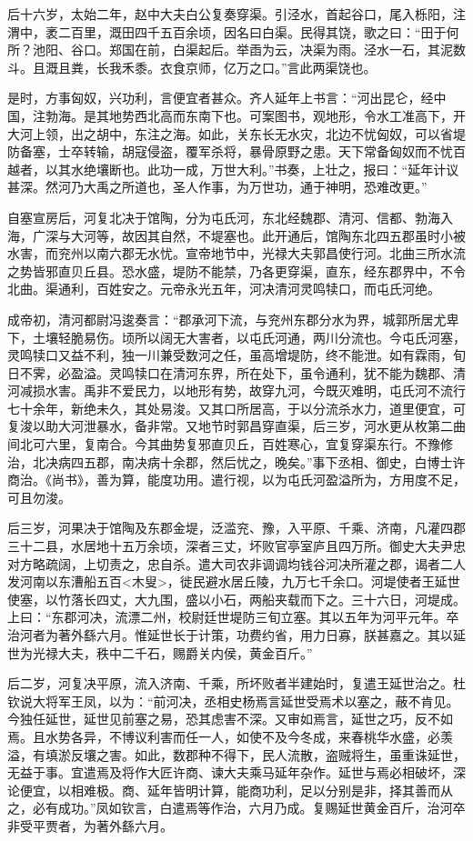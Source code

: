 \documentclass[]{article}
\begin{document}
后十六岁，太始二年，赵中大夫白公复奏穿渠。引泾水，首起谷口，尾入栎阳，注渭中，袤二百里，溉田四千五百余顷，因名曰白渠。民得其饶，歌之曰：``田于何所？池阳、谷口。郑国在前，白渠起后。举臿为云，决渠为雨。泾水一石，其泥数斗。且溉且粪，长我禾黍。衣食京师，亿万之口。''言此两渠饶也。

是时，方事匈奴，兴功利，言便宜者甚众。齐人延年上书言：``河出昆仑，经中国，注勃海。是其地势西北高而东南下也。可案图书，观地形，令水工准高下，开大河上领，出之胡中，东注之海。如此，关东长无水灾，北边不忧匈奴，可以省堤防备塞，士卒转输，胡寇侵盗，覆军杀将，暴骨原野之患。天下常备匈奴而不忧百越者，以其水绝壤断也。此功一成，万世大利。''书奏，上壮之，报曰：``延年计议甚深。然河乃大禹之所道也，圣人作事，为万世功，通于神明，恐难改更。''

自塞宣房后，河复北决于馆陶，分为屯氏河，东北经魏郡、清河、信都、勃海入海，广深与大河等，故因其自然，不堤塞也。此开通后，馆陶东北四五郡虽时小被水害，而兖州以南六郡无水忧。宣帝地节中，光禄大夫郭昌使行河。北曲三所水流之势皆邪直贝丘县。恐水盛，堤防不能禁，乃各更穿渠，直东，经东郡界中，不令北曲。渠通利，百姓安之。元帝永光五年，河决清河灵鸣犊口，而屯氏河绝。

成帝初，清河都尉冯逡奏言：``郡承河下流，与兖州东郡分水为界，城郭所居尤卑下，土壤轻脆易伤。顷所以阔无大害者，以屯氏河通，两川分流也。今屯氏河塞，灵鸣犊口又益不利，独一川兼受数河之任，虽高增堤防，终不能泄。如有霖雨，旬日不霁，必盈溢。灵鸣犊口在清河东界，所在处下，虽令通利，犹不能为魏郡、清河减损水害。禹非不爱民力，以地形有势，故穿九河，今既灭难明，屯氏河不流行七十余年，新绝未久，其处易浚。又其口所居高，于以分流杀水力，道里便宜，可复浚以助大河泄暴水，备非常。又地节时郭昌穿直渠，后三岁，河水更从枚第二曲间北可六里，复南合。今其曲势复邪直贝丘，百姓寒心，宜复穿渠东行。不豫修治，北决病四五郡，南决病十余郡，然后忧之，晚矣。''事下丞相、御史，白博士许商治。《尚书》，善为算，能度功用。遣行视，以为屯氏河盈溢所为，方用度不足，可且勿浚。

后三岁，河果决于馆陶及东郡金堤，泛滥兖、豫，入平原、千乘、济南，凡灌四郡三十二县，水居地十五万余顷，深者三丈，坏败官亭室庐且四万所。御史大夫尹忠对方略疏阔，上切责之，忠自杀。遣大司农非调调均钱谷河决所灌之郡，谒者二人发河南以东漕船五百\textless{}木叟\textgreater{}，徙民避水居丘陵，九万七千余口。河堤使者王延世使塞，以竹落长四丈，大九围，盛以小石，两船夹载而下之。三十六日，河堤成。上曰：``东郡河决，流漂二州，校尉廷世堤防三旬立塞。其以五年为河平元年。卒治河者为著外繇六月。惟延世长于计策，功费约省，用力日寡，朕甚嘉之。其以延世为光禄大夫，秩中二千石，赐爵关内侯，黄金百斤。''

后二岁，河复决平原，流入济南、千乘，所坏败者半建始时，复遣王延世治之。杜钦说大将军王凤，以为：``前河决，丞相史杨焉言延世受焉术以塞之，蔽不肯见。今独任延世，延世见前塞之易，恐其虑害不深。又审如焉言，延世之巧，反不如焉。且水势各异，不博议利害而任一人，如使不及今冬成，来春桃华水盛，必羡溢，有填淤反壤之害。如此，数郡种不得下，民人流散，盗贼将生，虽重诛延世，无益于事。宜遣焉及将作大匠许商、谏大夫乘马延年杂作。延世与焉必相破坏，深论便宜，以相难极。商、延年皆明计算，能商功利，足以分别是非，择其善而从之，必有成功。''凤如钦言，白遣焉等作治，六月乃成。复赐延世黄金百斤，治河卒非受平贾者，为著外繇六月。
\end{document}
